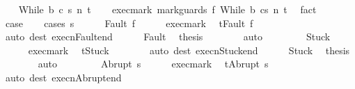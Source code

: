 \begin{isabellebody}
\isanewline
{}\isamarkupfalse%
\isanewline
\ \ \isamarkupfalse%
\ {\isacharparenleft}While\ b\ c\ s\ n\ t{\isacharparenright}\isanewline
\ \ \isamarkupfalse%
\ exec{\isacharunderscore}mark{\isacharcolon}\ {\isachardoublequoteopen}{\isasymGamma}{\isasymturnstile}{\isasymlangle}mark{\isacharunderscore}guards\ f\ {\isacharparenleft}While\ b\ c{\isacharparenright}{\isacharcomma}s{\isasymrangle}\ {\isacharequal}n{\isasymRightarrow}\ t{\isachardoublequoteclose}\ \isamarkupfalse%
\ fact\isanewline
\ \ \isamarkupfalse%
\ {\isacharquery}case\isanewline
\ \ \isamarkupfalse%
\ {\isacharparenleft}cases\ s{\isacharparenright}\isanewline
\ \ \ \ \isamarkupfalse%
\ {\isacharparenleft}Fault\ f{\isacharparenright}\isanewline
\ \ \ \ \isamarkupfalse%
\ exec{\isacharunderscore}mark\ \isamarkupfalse%
\ {\isachardoublequoteopen}t{\isacharequal}Fault\ f{\isachardoublequoteclose}\isanewline
\ \ \ \ \ \ \isamarkupfalse%
\ {\isacharparenleft}auto\ dest{\isacharcolon}\ execn{\isacharunderscore}Fault{\isacharunderscore}end{\isacharparenright}\isanewline
\ \ \ \ \isamarkupfalse%
\ Fault\ \isamarkupfalse%
\ {\isacharquery}thesis\isanewline
\ \ \ \ \ \ \isamarkupfalse%
\ auto\isanewline
\ \ \isamarkupfalse%
\isanewline
\ \ \ \ \isamarkupfalse%
\ Stuck\isanewline
\ \ \ \ \isamarkupfalse%
\ exec{\isacharunderscore}mark\ \isamarkupfalse%
\ {\isachardoublequoteopen}t{\isacharequal}Stuck{\isachardoublequoteclose}\isanewline
\ \ \ \ \ \ \isamarkupfalse%
\ {\isacharparenleft}auto\ dest{\isacharcolon}\ execn{\isacharunderscore}Stuck{\isacharunderscore}end{\isacharparenright}\isanewline
\ \ \ \ \isamarkupfalse%
\ Stuck\ \isamarkupfalse%
\ {\isacharquery}thesis\isanewline
\ \ \ \ \ \ \isamarkupfalse%
\ auto\isanewline
\ \ \isamarkupfalse%
\isanewline
\ \ \ \ \isamarkupfalse%
\ {\isacharparenleft}Abrupt\ s{\isacharprime}{\isacharparenright}\isanewline
\ \ \ \ \isamarkupfalse%
\ exec{\isacharunderscore}mark\ \isamarkupfalse%
\ {\isachardoublequoteopen}t{\isacharequal}Abrupt\ s{\isacharprime}{\isachardoublequoteclose}\isanewline
\ \ \ \ \ \ \isamarkupfalse%
\ {\isacharparenleft}auto\ dest{\isacharcolon}\ execn{\isacharunderscore}Abrupt{\isacharunderscore}end{\isacharparenright}\isanewline

\end{isabellebody}
